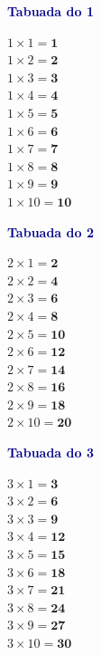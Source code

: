 \documentclass[12pt]{article}
\begin{document}
\vspace{4pt}


\vspace{6pt}\noindent
\begin{minipage}[t]{3.3cm}
\noindent\textcolor{darkblue}{\bfseries\small Tabuada do 1}\par\vspace{2pt}
{\footnotesize
$1\times1=\mathbf{1}$\\$1\times2=\mathbf{2}$\\$1\times3=\mathbf{3}$\\
$1\times4=\mathbf{4}$\\$1\times5=\mathbf{5}$\\$1\times6=\mathbf{6}$\\
$1\times7=\mathbf{7}$\\$1\times8=\mathbf{8}$\\$1\times9=\mathbf{9}$\\
$1\times10=\mathbf{10}$}
\end{minipage}\hfill
\begin{minipage}[t]{3.3cm}
\noindent\textcolor{darkblue}{\bfseries\small Tabuada do 2}\par\vspace{2pt}
{\footnotesize
$2\times1=\mathbf{2}$\\$2\times2=\mathbf{4}$\\$2\times3=\mathbf{6}$\\
$2\times4=\mathbf{8}$\\$2\times5=\mathbf{10}$\\$2\times6=\mathbf{12}$\\
$2\times7=\mathbf{14}$\\$2\times8=\mathbf{16}$\\$2\times9=\mathbf{18}$\\
$2\times10=\mathbf{20}$}
\end{minipage}\hfill
\begin{minipage}[t]{3.3cm}
\noindent\textcolor{darkblue}{\bfseries\small Tabuada do 3}\par\vspace{2pt}
{\footnotesize
$3\times1=\mathbf{3}$\\$3\times2=\mathbf{6}$\\$3\times3=\mathbf{9}$\\
$3\times4=\mathbf{12}$\\$3\times5=\mathbf{15}$\\$3\times6=\mathbf{18}$\\
$3\times7=\mathbf{21}$\\$3\times8=\mathbf{24}$\\$3\times9=\mathbf{27}$\\
$3\times10=\mathbf{30}$}
\end{minipage}\hfill
\end{document}
